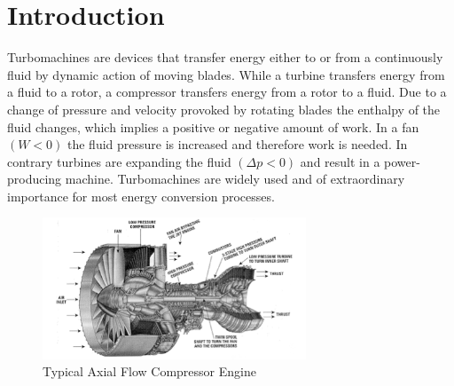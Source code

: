 
\chapter{Introduction}\label{sec:introduction}

Turbomachines are devices that transfer energy either to or from a continuously fluid by dynamic action of moving blades. While a turbine transfers energy from a fluid to a rotor, a compressor transfers energy from a rotor to a fluid. Due to a change of pressure and velocity provoked by rotating blades the enthalpy of the fluid changes, which implies a positive or negative amount of work. In a fan $(W < 0)$ the fluid pressure is increased and therefore work is needed. In contrary turbines are expanding the fluid $(\Delta p < 0)$ and result in a power-producing machine. Turbomachines are widely used and of extraordinary importance for most energy conversion processes.

\begin{figure}[H]
\centering
\includegraphics[width=0.7\textwidth]{pics/f1.png}
\caption{Typical Axial Flow Compressor Engine}
\label{fig:f1}
\end{figure}

